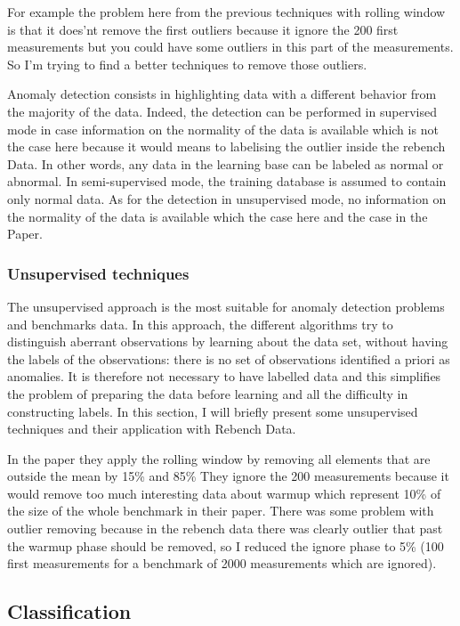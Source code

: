 \documentclass{article}
\begin{document}
For example the problem here from the previous techniques with rolling window is that it does'nt remove the first outliers because it ignore the 200 first measurements but you could have some outliers in this part of the measurements. So I'm trying to find a better techniques to remove those outliers.

Anomaly detection consists in highlighting data with a different behavior from the majority of the data. 
Indeed, the detection can be performed in supervised mode in case information on the normality of the data is available which is not the case here because it would means to labelising the outlier inside the rebench Data. In other words, any data in the learning base can be labeled as normal or abnormal. In semi-supervised mode, the training database is assumed to contain only normal data. 
As for the detection in unsupervised mode, no information on the normality of the data is available which the case here and the case in the \cite{barrett2017virtual} Paper. 

\subsubsection{Unsupervised techniques}
The unsupervised approach is the most suitable for anomaly detection problems and benchmarks data. In this approach, the different algorithms try to distinguish aberrant observations by learning about the data set, without having the labels of the observations: there is no set of observations identified a priori as anomalies. It is therefore not necessary to have labelled data and this simplifies the problem of preparing the data before learning and all the difficulty in constructing labels. In this section, I will briefly present some unsupervised techniques and their application with Rebench Data.

In the paper they apply the rolling window by removing all elements that are outside the mean by 15\% and 85\% They ignore the 200 measurements because it would remove too much interesting data about warmup which represent 10\% of the size of the whole benchmark in their paper. There was some problem with outlier removing because in the rebench data there was clearly outlier that past the warmup phase should be removed, so I reduced the ignore phase to 5\% (100 first measurements for a benchmark of 2000 measurements  which are ignored).

\subsection{Classification}
\end{document}
